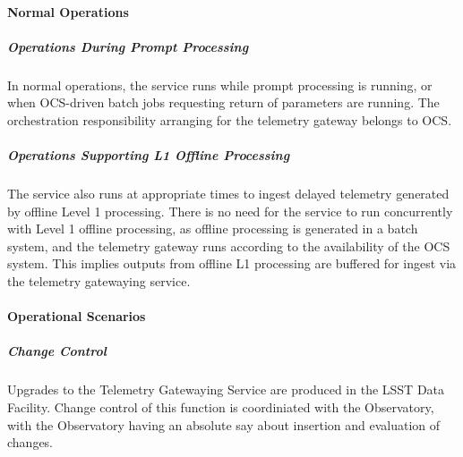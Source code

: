 \paragraph{Normal Operations}

\subparagraph{Operations During Prompt Processing}

In normal operations, the service runs while prompt processing is running,
or when OCS-driven batch jobs requesting return of parameters are running.
The orchestration responsibility arranging for the telemetry gateway belongs to OCS.

\subparagraph{Operations Supporting L1 Offline Processing}
The service also runs at appropriate times to ingest delayed telemetry
generated by offline Level 1  processing. There is no need for the service
to run concurrently with Level 1 offline processing, as offline processing is
generated in a batch system, and the telemetry gateway runs according to
the availability of the OCS system. This implies outputs from offline L1 processing
are buffered for ingest via the telemetry gatewaying service.

\paragraph{Operational Scenarios}

\subparagraph{Change Control}

Upgrades to the Telemetry Gatewaying Service are produced in the LSST Data Facility.
Change control of this function is coordiniated with the Observatory, with the
Observatory having an absolute say about insertion and evaluation of changes.
